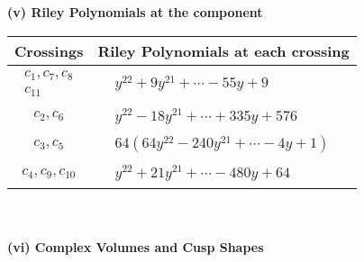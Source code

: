 \documentclass[1p]{elsarticle_modified}
\theoremstyle{definition}
\begin{document}
\newpage\renewcommand{\arraystretch}{1}
\flushleft \textbf{(v) Riley Polynomials at the component}\newline \\
\begin{tabular}{m{50pt}|m{274pt}}
Crossings & \hspace{64pt}Riley Polynomials at each crossing \\
\hline $$\begin{aligned}c_{1},c_{7},c_{8}\\c_{11}\end{aligned}$$&$\begin{aligned}
&y^{22}+9 y^{21}+\cdots-55 y+9
\end{aligned}$\\
\hline $$\begin{aligned}c_{2},c_{6}\end{aligned}$$&$\begin{aligned}
&y^{22}-18 y^{21}+\cdots+335 y+576
\end{aligned}$\\
\hline $$\begin{aligned}c_{3},c_{5}\end{aligned}$$&$\begin{aligned}
&64(64 y^{22}-240 y^{21}+\cdots-4 y+1)
\end{aligned}$\\
\hline $$\begin{aligned}c_{4},c_{9},c_{10}\end{aligned}$$&$\begin{aligned}
&y^{22}+21 y^{21}+\cdots-480 y+64
\end{aligned}$\\
\hline
\end{tabular}\\~\\
\newpage\flushleft \textbf{(vi) Complex Volumes and Cusp Shapes}
\end{document}
